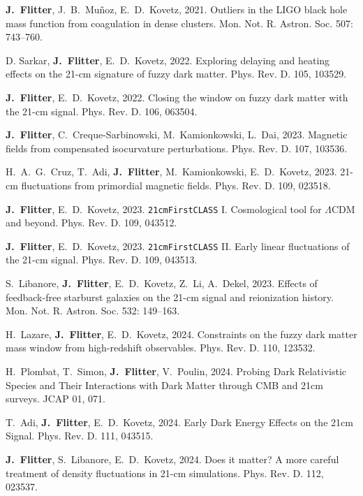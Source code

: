 \documentclass[letterpaper,12pt]{article}
\renewenvironment{itemize}{
  \begin{list}{}{
    \setlength{\leftmargin}{1.5em}
  }
}{
  \end{list}
}
\begin{document}
\begin{itemize}
	\item \textbf{J.~Flitter}, J.~B.~Muñoz, E.~D.~Kovetz, 2021. Outliers in the LIGO black hole mass function from coagulation in dense clusters. Mon. Not. R. Astron. Soc. 507: 743–760.%
	\item D. Sarkar, \textbf{J.~Flitter}, E.~D.~Kovetz, 2022. Exploring delaying and heating effects on the 21-cm signature of fuzzy dark matter. Phys. Rev. D. 105, 103529.%
	\item \textbf{J.~Flitter}, E.~D.~Kovetz, 2022. Closing the window on fuzzy dark matter with the 21-cm signal. Phys. Rev. D. 106, 063504.%
	\item \textbf{J.~Flitter}, C.~Creque-Sarbinowski, M.~Kamionkowski, L.~Dai, 2023. Magnetic fields from compensated isocurvature perturbations. Phys. Rev. D. 107, 103536.%
	\item H.~A.~G.~Cruz, T.~Adi, \textbf{J.~Flitter}, M.~Kamionkowski, E.~D.~Kovetz, 2023. 21-cm fluctuations from primordial magnetic fields. Phys. Rev. D. 109, 023518.
	\item \textbf{J.~Flitter}, E.~D.~Kovetz, 2023. {\tt 21cmFirstCLASS} I. Cosmological tool for $\Lambda$CDM and beyond. Phys. Rev. D. 109, 043512.
	\item \textbf{J.~Flitter}, E.~D.~Kovetz, 2023. {\tt 21cmFirstCLASS} II. Early linear fluctuations of the 21-cm signal. Phys. Rev. D. 109, 043513.
	\item S.~Libanore, \textbf{J.~Flitter}, E.~D.~Kovetz, Z.~Li, A.~Dekel, 2023. Effects of feedback-free starburst galaxies on the 21-cm signal and reionization history. Mon. Not. R. Astron. Soc. 532: 149–163.
	\item H.~Lazare, \textbf{J.~Flitter}, E.~D.~Kovetz, 2024. Constraints on the fuzzy dark matter mass window from high-redshift observables. Phys. Rev. D. 110, 123532.
	\item H.~Plombat, T.~Simon, \textbf{J.~Flitter}, V.~Poulin, 2024. Probing Dark Relativistic Species and Their Interactions with Dark Matter through CMB and 21cm surveys. JCAP 01, 071.
	\item T.~Adi, \textbf{J.~Flitter}, E.~D.~Kovetz, 2024. Early Dark Energy Effects on the 21cm Signal. Phys. Rev. D. 111, 043515.
	\item \textbf{J.~Flitter}, S.~Libanore, E.~D.~Kovetz, 2024. Does it matter? A more careful treatment of density fluctuations in 21-cm simulations. Phys. Rev. D. 112, 023537.
\end{itemize}
\end{document}
